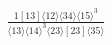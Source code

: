 \documentclass[varwidth, border=5pt]{standalone}
\begin{document}
\begin{my}
$\begin{gathered}
\scriptscriptstyle\frac{1[13]⟨12⟩⟨34⟩⟨15⟩^3}{⟨13⟩⟨14⟩^3⟨23⟩[23]⟨35⟩}
\end{gathered}$
\end{my}
\end{document}
